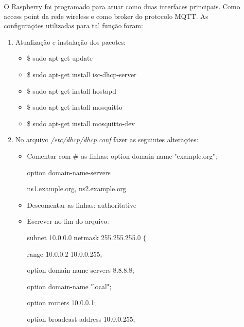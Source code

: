 

O Raspberry foi programado para atuar como duas interfaces principais. Como access point da rede wireless e como broker do protocolo MQTT. As configurações utilizadas para tal função foram:

\begin{enumerate}
    \item Atualização e instalação dos pacotes:
        \begin{itemize}
            \item \$ sudo apt-get update
            \item \$ sudo apt-get install isc-dhcp-server
            \item \$ sudo apt-get install hostapd
            \item \$ sudo apt-get install mosquitto
            \item \$ sudo apt-get install mosquitto-dev
        \end{itemize}
    
    \item No arquivo \textit{/etc/dhcp/dhcp.conf} fazer as seguintes alterações:
        \begin{itemize}
            \item Comentar com # as linhas:
                option domain-name "example.org";
                
                option domain-name-servers 
                
                ns1.example.org, ns2.example.org
            \item Descomentar as linhas:
                authoritative
            \item Escrever no fim do arquivo:

                subnet 10.0.0.0 netmask 255.255.255.0 $\{$

                \hspace*{6mm}    range 10.0.0.2 10.0.0.255;
                
                \hspace*{6mm}    option domain-name-servers 8.8.8.8;
                
                \hspace*{6mm}    option domain-name "local";
                
                \hspace*{6mm}    option routers 10.0.0.1;
                
                \hspace*{6mm}    option broadcast-address 10.0.0.255;
                

\end{itemize}
\end{enumerate}
